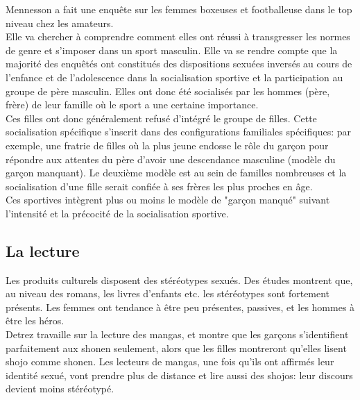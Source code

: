 \documentclass[12pt, a4paper, openany]{book}
\begin{document}
Mennesson a fait une enquête sur les femmes boxeuses et footballeuse dans le top niveau chez les amateurs. \\
Elle va chercher à comprendre comment elles ont réussi à transgresser les normes de genre et s'imposer dans un sport masculin. Elle va se rendre compte que la majorité des enquêtés ont constitués des dispositions sexuées inversés au cours de l'enfance et de l'adolescence dans la socialisation sportive et la participation au groupe de père masculin. Elles ont donc été socialisés par les hommes (père, frère) de leur famille où le sport a une certaine importance. \\
Ces filles ont donc généralement refusé d'intégré le groupe de filles. Cette socialisation spécifique s'inscrit dans des configurations familiales spécifiques: par exemple, une fratrie de filles où la plus jeune endosse le rôle du garçon pour répondre aux attentes du père d'avoir une descendance masculine (modèle du garçon manquant). Le deuxième modèle est au sein de familles nombreuses et la socialisation d'une fille serait confiée à ses frères les plus proches en âge. \\
Ces sportives intègrent plus ou moins le modèle de "garçon manqué" suivant l'intensité et la précocité de la socialisation sportive. 

\subsection{La lecture}

Les produits culturels disposent des stéréotypes sexués. Des études montrent que, au niveau des romans, les livres d'enfants etc. les stéréotypes sont fortement présents. Les femmes ont tendance à être peu présentes, passives, et les hommes à être les héros. \\
Detrez travaille sur la lecture des mangas, et montre que les garçons s'identifient parfaitement aux shonen seulement, alors que les filles montreront qu'elles lisent shojo comme shonen. Les lecteurs de mangas, une fois qu'ils ont affirmés leur identité sexué, vont prendre plus de distance et lire aussi des shojos: leur discours devient moins stéréotypé. 
\end{document}
